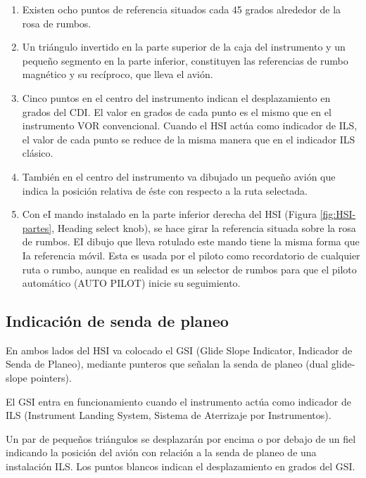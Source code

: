 \begin{enumerate}

\item Existen ocho puntos de referencia situados cada 45 grados alrededor de la rosa de rumbos.

\item Un triángulo invertido en la parte superior de la caja del instrumento y un pequeño segmento en la parte inferior, constituyen las referencias de rumbo magnético y su recíproco, que lleva el avión.

\item Cinco puntos en el centro del instrumento indican el desplazamiento en grados del CDI. El valor en grados de cada punto es el mismo que en el instrumento VOR convencional. Cuando el HSI actúa como indicador de ILS, el valor de cada punto se reduce de la misma manera que en el indicador ILS clásico. 

\item También en el centro del instrumento va dibujado un pequeño avión que indica la posición relativa de éste con respecto a la ruta selectada.

\item Con eI mando instalado en la parte inferior derecha del HSI (Figura \ref{fig:HSI-partes}, Heading select knob), se hace girar la referencia situada sobre la rosa de rumbos. EI dibujo que lleva rotulado este mando tiene la misma forma que Ia referencia móvil. Esta es usada por el piloto como recordatorio de cualquier ruta o rumbo, aunque en realidad es un selector de rumbos para que el piloto automático (AUTO PILOT) inicie su seguimiento.

\end{enumerate}

\subsection{Indicaci\'on de senda de planeo}

En ambos lados del HSI va colocado el GSI (Glide Slope Indicator, Indicador de Senda de Planeo), mediante punteros que señalan la senda de planeo (dual glide-slope pointers).

El GSI entra en funcionamiento cuando el instrumento actúa como indicador de ILS (Instrument Landing System, Sistema de Aterrizaje por Instrumentos).

Un par de pequeños triángulos se desplazarán por encima o por debajo de un fiel indicando la posición del avión con relación a la senda de planeo de una instalación ILS. Los puntos blancos indican el desplazamiento en grados del GSI. 

